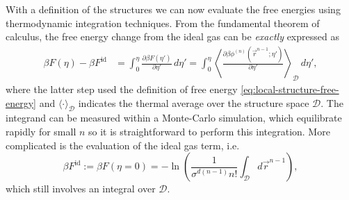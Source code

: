 \documentclass[11pt,twoside]{report}
\begin{document}
With a definition of the structures we can now evaluate the free energies using thermodynamic integration techniques.
From the fundamental theorem of calculus, the free energy change from the ideal gas can be \emph{exactly} expressed as \cite{Frenkel2002}
\begin{align}\label{eq:td-integration}
  \beta F(\eta)
  - \beta F^\mathrm{id}
  &=
  \int_0^\eta \frac{\partial \beta F(\eta')}{\partial \eta'} \, d\eta'
  =
  \int_0^\eta
  \left\langle
  \frac{\partial \beta \phi^{(n)}(\vec{r}^{n-1}; \eta')}{\partial \eta'}
  \right\rangle_\mathcal{D}
  \, d\eta',
\end{align}
where the latter step used the definition of free energy \eqref{eq:local-structure-free-energy} and $\langle \cdot \rangle_\mathcal{D}$ indicates the thermal average over the structure space $\mathcal{D}$.
The integrand can be measured within a Monte-Carlo simulation, which equilibrate rapidly for small $n$ so it is straightforward to perform this integration.
More complicated is the evaluation of the ideal gas term, i.e.\
\begin{equation}\label{eq:local-structure-free-energy-ideal}
  \beta F^\mathrm{id}
  :=
  \beta F(\eta=0)
  =
  -\ln{
    \left(
      \frac{1}{\sigma^{d(n-1)} n!}
      \int_{\mathcal{D}} d\vec{r}^{n-1}
    \right)
  },
\end{equation}
which still involves an integral over $\mathcal{D}$.
\end{document}
